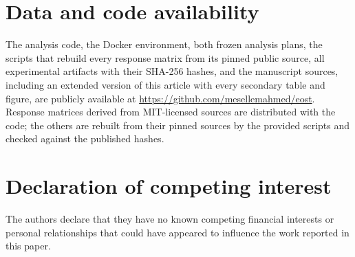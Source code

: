 \section*{Data and code availability}
The analysis code, the Docker environment, both frozen analysis plans, the scripts that
rebuild every response matrix from its pinned public source, all experimental artifacts with
their SHA-256 hashes, and the manuscript sources, including an extended version of this
article with every secondary table and figure, are publicly available at
\url{https://github.com/mesellemahmed/eost}. Response matrices derived from MIT-licensed
sources are distributed with the code; the others are rebuilt from their pinned sources by
the provided scripts and checked against the published hashes.

\section*{Declaration of competing interest}
The authors declare that they have no known competing financial interests or personal
relationships that could have appeared to influence the work reported in this paper.
